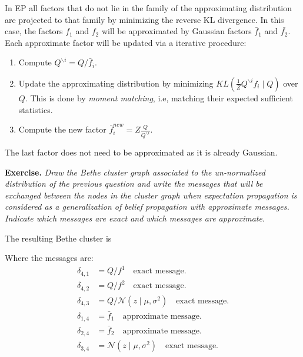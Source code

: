 \documentclass[11pt]{article}
\theoremstyle{definition}
\begin{document}
In EP all factors that do not lie in the family of the approximating distribution are projected to that family by minimizing the reverse KL divergence. In this case, the factors \( f_1 \) and \( f_2 \) will be approximated by Gaussian factors \( \bar{f}_1 \) and \( \bar{f_2} \). Each approximate factor will be updated via a iterative procedure:
\begin{enumerate}
    \item Compute \( Q^{\backslash i} = Q / \bar{f}_i \).
    \item Update the approximating distribution by minimizing \( KL\left(\frac{1}{Z}Q^{\backslash i} f_i \mid Q\right) \) over \( Q \). This is done by \emph{moment matching}, i.e,  matching their expected sufficient statistics. 
    \item Compute the new factor \( \bar{f}_i^{new} = Z \frac{Q}{Q^{\backslash i}} \).  
\end{enumerate}

The last factor does not need to be approximated as it is already Gaussian.

\textbf{Exercise. } \emph{Draw the Bethe cluster graph associated to the un-normalized distribution of the previous question and write the messages that will be exchanged between the nodes in the cluster graph when expectation propagation is considered as a generalization of belief propagation with approximate messages. Indicate which messages are exact and which messages are approximate}.

The resulting Bethe cluster is 
\begin{figure}[H]
    \centering
{}
\end{figure}
Where the messages are:
\[
     \begin{aligned}
        \delta_{4,1} &= Q/f^1 \quad \text{exact message.}\\
        \delta_{4,2} &= Q/f^2\quad \text{exact message.}\\
        \delta_{4,3} &= Q/\mathcal{N}(z \mid \mu, \sigma^2)\quad \text{exact message.}\\
        \delta_{1,4} &= \bar{f}_1\quad \text{approximate message.}\\
        \delta_{2,4} &= \bar{f}_2\quad \text{approximate message.}\\
        \delta_{3,4} &= \mathcal{N}(z \mid \mu, \sigma^2)\quad \text{exact message.}\\
     \end{aligned}
\]
\end{document}
